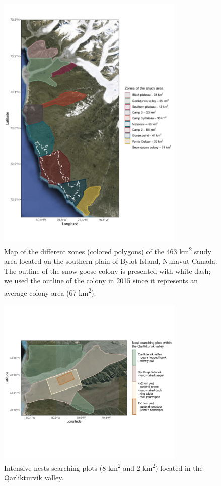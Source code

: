 \documentclass[a4paper,twoside,10pt]{article}
\begin{document}
\begin{figure}
\centering
  \includegraphics[width=0.8\textwidth, angle=0]{figures/zones_study_area.pdf}
   \caption{Map of the different zones (colored polygons) of the 463 km\textsuperscript{2} study area located on the southern plain of Bylot Island, Nunavut Canada. The outline of the snow goose colony is presented with white dash; we used the outline of the colony in 2015 since it represents an average colony area (67 km\textsuperscript{2}).}
  \label{figure:zones}
\end{figure}

\begin{figure}
\centering
  \includegraphics[width=0.8\textwidth, angle=0]{figures/qarlikturvik_valley.pdf}
  \vspace{-70pt} %
  \caption{Intensive nests searching plots (8 km\textsuperscript{2} and 2 km\textsuperscript{2}) located in the Qarlikturvik valley.}
 \label{figure:qarlikturvik_valley}
\end{figure}
\newpage
\end{document}
